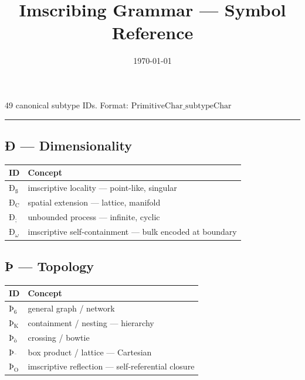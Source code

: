 \documentclass[12pt,a4paper]{article}
\begin{document}
\title{Imscribing Grammar --- Symbol Reference}
\date{\today}

\maketitle

49 canonical subtype IDs. Format: $\text{PrimitiveChar\_subtypeChar}$

\begin{center}
\rule{0.5\textwidth}{0.4pt}
\end{center}

\subsection{Ð --- Dimensionality}

\begin{table}[htbp]
\centering
\small
{}
\begin{tabularx}{\textwidth}{>{\centering\arraybackslash}X >{\centering\arraybackslash}X}
\toprule
\rowcolor{gray!25}\textbf{ID} & \textbf{Concept} \\
\midrule
\rowcolors{1}{white}{gray!10}
$Ð_{\text{ß}}$ & imscriptive locality --- point-like, singular \\
$Ð_{\text{C}}$ & spatial extension --- lattice, manifold \\
$Ð_{\text{;}}$ & unbounded process --- infinite, cyclic \\
$Ð_{\omega}$ & imscriptive self-containment --- bulk encoded at boundary \\
\bottomrule
\end{tabularx}
\end{table}

\subsection{Þ --- Topology}

\begin{table}[htbp]
\centering
\small
{}
\begin{tabularx}{\textwidth}{>{\centering\arraybackslash}X >{\centering\arraybackslash}X}
\toprule
\rowcolor{gray!25}\textbf{ID} & \textbf{Concept} \\
\midrule
\rowcolors{1}{white}{gray!10}
$Þ_{\text{6}}$ & general graph / network \\
$Þ_{\text{K}}$ & containment / nesting --- hierarchy \\
$Þ_{\text{ò}}$ & crossing / bowtie \\
$Þ_{\text{¨}}$ & box product / lattice --- Cartesian \\
$Þ_{\text{O}}$ & imscriptive reflection --- self-referential closure \\
\bottomrule
\end{tabularx}
\end{table}
\end{document}
